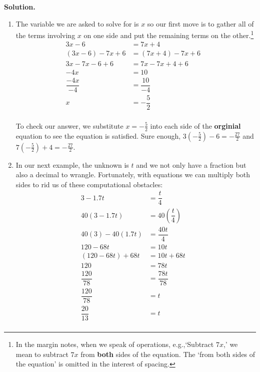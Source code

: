 \begin{ex}
\begin{multicols}{2}
\end{multicols}

{\bf Solution.} 

\begin{enumerate}

\item  The variable we are asked to solve for is $x$ so our first move is to gather all of the terms involving $x$ on one side and put the remaining terms on the other.\footnote{In the margin notes, when we speak of operations, e.g.,`Subtract $7x$,' we mean to subtract $7x$ from \textbf{both} sides of the equation.  The `from both sides of the equation' is omitted in the interest of spacing.}
\begin{align*}
3x - 6 &  = 7x + 4 & \\
(3x-6) - 7x + 6 &  = (7x+4) -7x +6 \tag{Subtract $7x$, add $6$} \\
3x - 7x - 6 + 6 & = 7x - 7x + 4 + 6 & \tag{Rearrange terms} \\
-4x & = 10 \tag{$3x-7x = (3-7)x = -4x$} \\
\dfrac{-4x}{-4} & = \dfrac{10}{-4} \tag{Divide by the coefficient of $x$} \\
x & = -\dfrac{5}{2} \tag{Reduce to lowest terms} \\
\end{align*}
											
To check our answer, we substitute $x = -\frac{5}{2}$ into each side of the \textbf{orginial} equation to see the equation is satisfied.  Sure enough, $3\left(-\frac{5}{2}\right) - 6 = -\frac{27}{2}$ and $7\left(-\frac{5}{2}\right) + 4 = -\frac{27}{2}$.

\item  In our next example, the unknown is $t$ and we not only have a fraction but also a decimal to wrangle.  Fortunately, with equations we can multiply both sides to rid us of  these computational obstacles:
\begin{align*}
3 - 1.7t  & = \dfrac{t}{4} \\
40(3 - 1.7t)  & = 40 \left(\dfrac{t}{4}\right) \tag{Multiply by $40$} \\
40(3) - 40(1.7t)  & = \dfrac{40 t}{4} & \tag{Distribute} \\
120 - 68t & = 10 t \\
(120 -68t) + 68 t & = 10t + 68 t & \tag{Add $68t$ to both sides} \\
120 & = 78 t & \tag{$68t + 10t = (68 + 10)t = 78 t$}\\
\dfrac{120}{78} & = \dfrac{78t}{78} \tag{Divide by the coefficient of $t$}\\
\dfrac{120}{78} & = t \\
\dfrac{20}{13} & = t \tag{Reduce to lowest terms} \\
\end{align*}
											

\end{enumerate}
\end{ex}
